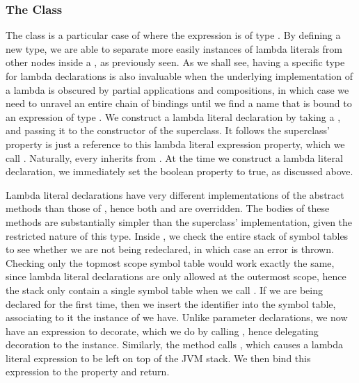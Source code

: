 \subsubsection{The  Class}

The  class is a particular case of  where the expression is of type . By defining a new type, we are able to separate more easily instances of lambda literals from other nodes inside a , as previously seen. As we shall see, having a specific type for lambda declarations is also invaluable when the underlying implementation of a lambda is obscured by partial applications and compositions, in which case we need to unravel an entire chain of bindings until we find a name that is bound to an expression of type . We construct a lambda literal declaration by taking a , and passing it to the constructor of the superclass. It follows the superclass'  property is just a reference to this lambda literal expression property, which we call . Naturally, every  inherits from . At the time we construct a lambda literal declaration, we immediately set the  boolean property to true, as discussed above.

Lambda literal declarations have very different implementations of the  abstract methods than those of , hence both  and  are overridden. The bodies of these methods are substantially simpler than the superclass' implementation, given the restricted nature of this type. Inside , we check the entire stack of symbol tables to see whether we are not being redeclared, in which case an error is thrown. Checking only the topmost scope symbol table would work exactly the same, since lambda literal declarations are only allowed at the outermost scope, hence the stack only contain a single symbol table when we call . If we are being declared for the first time, then we insert the identifier into the symbol table, associating to it the instance of  we have. Unlike parameter declarations, we now have an expression to decorate, which we do by calling , hence delegating decoration to the  instance. Similarly, the  method calls , which causes a lambda literal expression to be left on top of the JVM stack. We then bind this expression to the  property and return.

